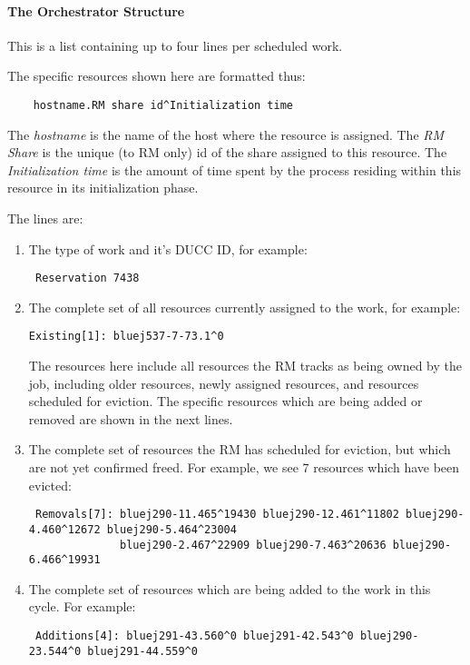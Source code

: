    \paragraph{The Orchestrator Structure}
      This is a list containing up to four lines per scheduled work.  
      
      The specific resources shown here are formatted thus:
\begin{verbatim}
    hostname.RM share id^Initialization time
\end{verbatim}
      The {\em hostname} is the name of the host where the resource is assigned.  The {\em RM Share}
      is the unique (to RM only) id of the share assigned to this resource.  The {\em Initialization time}
      is the amount of time spent by the process residing within this resource in its initialization phase.
      
      The lines are:
      \begin{enumerate}
        \item The type of work and it's DUCC ID, for example: 
\begin{verbatim}
 Reservation 7438
\end{verbatim}
        \item The complete set of all resources currently assigned to the work, for example:
\begin{verbatim}
Existing[1]: bluej537-7-73.1^0
\end{verbatim}
          The resources here include all resources the RM tracks as being owned by the job, including
          older resources, newly assigned resources, and resources scheduled for eviction.  The specific
          resources which are being added or removed are shown in the next lines.
          
        \item The complete set of resources the RM has scheduled for eviction, but which are not
          yet confirmed freed.  For example, we see 7 resources which have been evicted:
\begin{verbatim}
 Removals[7]: bluej290-11.465^19430 bluej290-12.461^11802 bluej290-4.460^12672 bluej290-5.464^23004 
              bluej290-2.467^22909 bluej290-7.463^20636 bluej290-6.466^19931 
\end{verbatim}

        \item The complete set of resources which are being added to the work in this cycle.  For
          example:

\begin{verbatim}
 Additions[4]: bluej291-43.560^0 bluej291-42.543^0 bluej290-23.544^0 bluej291-44.559^0 
\end{verbatim}
      \end{enumerate}
         
